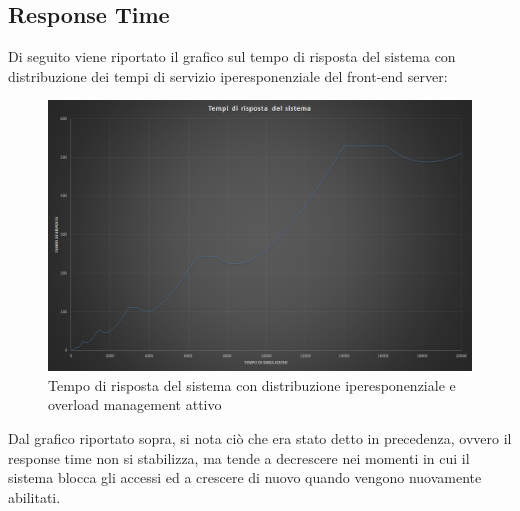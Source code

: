 \subsection{Response Time}

Di seguito viene riportato il grafico sul tempo di risposta del sistema con distribuzione dei 
tempi di servizio iperesponenziale del front-end server:

\begin{figure}[H]
 \centering
 \includegraphics[scale=0.45]{img/responseOM.png}
 \caption[Tempo di risposta del sistema con distribuzione iperesponenziale e overload management attivo]{Tempo di risposta del sistema con distribuzione iperesponenziale e overload management attivo}
 \label{fig:Tempo di risposta del sistema con distribuzione iperesponenziale e overload management attivo}
\end{figure}

Dal grafico riportato sopra, si nota ci\`o che era stato detto in precedenza, ovvero il response time
non si stabilizza, ma tende a decrescere nei momenti in cui il sistema blocca gli accessi ed a crescere di 
nuovo quando vengono nuovamente abilitati.

